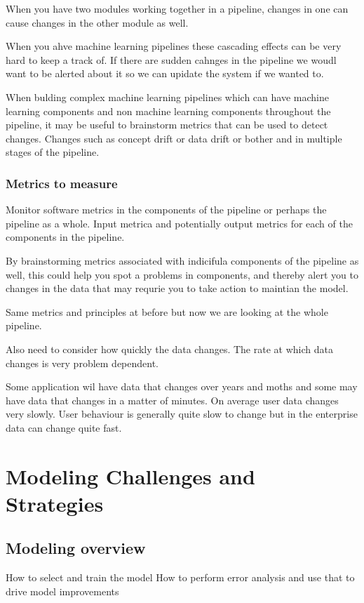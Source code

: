 When you have two modules working together in a pipeline, changes in one can cause changes in the other module as well.

When you ahve machine learning pipelines these cascading effects can be very hard to keep a track of. If there are sudden cahnges in the pipeline we woudl want to be alerted about it so we can upidate the system if we wanted to.

When bulding complex machine learning pipelines which can have machine learning components and non machine learning components throughout the pipeline, it may be useful to brainstorm metrics that can be used to detect changes.
Changes such as concept drift or data drift or bother and in multiple stages of the pipeline.



\subsection{Metrics to measure}

Monitor software metrics in the components of the pipeline or perhaps the pipeline as a whole.
Input metrica and potentially output metrics for each of the components in the pipeline.

By brainstorming metrics associated with indicifula components of the pipeline as well, this could help you spot a problems in components, and thereby alert you to changes in the data that may requrie you to take action to maintian the model.

Same metrics and principles at before but now we are looking at the whole pipeline.

Also need to consider how quickly the data changes.
The rate at which data changes is very problem dependent.

Some application wil have data that changes over years and moths and some may have data that changes in a matter of minutes.
On average user data changes very slowly.
User behaviour is generally quite slow to change but in the enterprise data can change quite fast.


\chapter{Modeling Challenges and Strategies}

\section{Modeling overview}
How to select and train the model
How to perform error analysis and use that to drive model improvements

